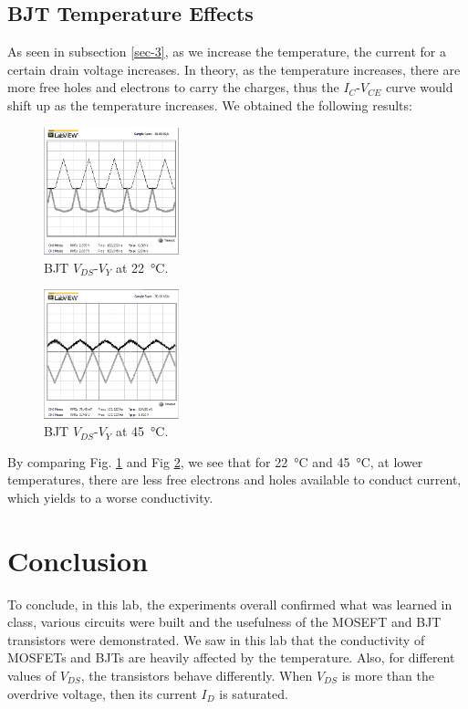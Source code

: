 \documentclass[journal]{IEEEtran}
\begin{document}
\subsection{BJT Temperature Effects}
\par As seen in subsection \ref{sec-3}, as we increase the temperature, the
current for a certain drain voltage increases. In theory, as
the temperature increases, there are more free holes and
electrons to carry the charges, thus the $I_{C}$-$V_{CE}$ curve would
shift up as the temperature increases. We obtained the following results:
\begin{figure}[h]
  \centering
  \includegraphics[width=0.35\textwidth]{images/4-1.png}
  \caption{BJT $V_{DS}$-$V_{Y}$ at \SI{22}{\celsius}.}
  \label{fig-9}
\end{figure}
\begin{figure}[h]
  \centering
  \includegraphics[width=0.35\textwidth]{images/4-2.png}
  \caption{BJT $V_{DS}$-$V_{Y}$ at \SI{45}{\celsius}.}
  \label{fig-10}
\end{figure}
\par By comparing Fig. \ref{fig-9} and Fig \ref{fig-10}, we see that for \SI{22}{\celsius}
and \SI{45}{\celsius}, at lower temperatures, there are less
free electrons and holes available to conduct current, which yields to a worse conductivity.
\section{Conclusion}
\par To conclude, in this lab, the experiments overall confirmed what was learned in class, various circuits were built and the usefulness of the MOSEFT and BJT transistors were demonstrated.
We saw in this lab that the conductivity of MOSFETs and BJTs are heavily affected by the temperature. Also, for different values of $V_{DS}$, the transistors behave differently. When $V_{DS}$ is more than the overdrive voltage, then its current  $I_{D}$ is saturated.
\end{document}
